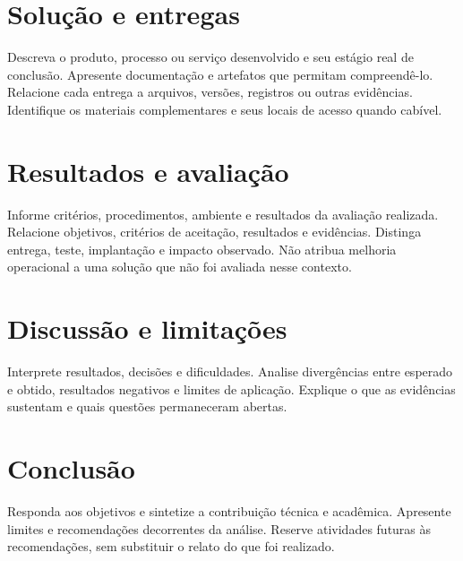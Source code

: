 \chapter{Solução e entregas}
Descreva o produto, processo ou serviço desenvolvido e seu estágio real de
conclusão. Apresente documentação e artefatos que permitam compreendê-lo.
Relacione cada entrega a arquivos, versões, registros ou outras evidências.
Identifique os materiais complementares e seus locais de acesso quando cabível.

\chapter{Resultados e avaliação}
Informe critérios, procedimentos, ambiente e resultados da avaliação realizada.
Relacione objetivos, critérios de aceitação, resultados e evidências. Distinga entrega,
teste, implantação e impacto observado. Não atribua melhoria operacional
a uma solução que não foi avaliada nesse contexto.

\chapter{Discussão e limitações}
Interprete resultados, decisões e dificuldades. Analise divergências entre
esperado e obtido, resultados negativos e limites de aplicação. Explique o que
as evidências sustentam e quais questões permaneceram abertas.

\chapter{Conclusão}
Responda aos objetivos e sintetize a contribuição técnica e acadêmica.
Apresente limites e recomendações decorrentes da análise. Reserve atividades
futuras às recomendações, sem substituir o relato do que foi realizado.
